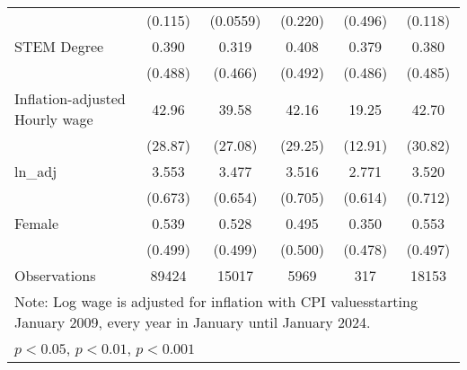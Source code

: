 \begin{table}[htbp]
\begin{tabular}{l*{5}{c}}
                    &     (0.115)         &    (0.0559)         &     (0.220)         &     (0.496)         &     (0.118)         \\
[1em]
STEM Degree         &       0.390         &       0.319         &       0.408         &       0.379         &       0.380         \\
                    &     (0.488)         &     (0.466)         &     (0.492)         &     (0.486)         &     (0.485)         \\
[1em]
Inflation-adjusted Hourly wage&       42.96         &       39.58         &       42.16         &       19.25         &       42.70         \\
                    &     (28.87)         &     (27.08)         &     (29.25)         &     (12.91)         &     (30.82)         \\
[1em]
ln\_adj              &       3.553         &       3.477         &       3.516         &       2.771         &       3.520         \\
                    &     (0.673)         &     (0.654)         &     (0.705)         &     (0.614)         &     (0.712)         \\
[1em]
Female              &       0.539         &       0.528         &       0.495         &       0.350         &       0.553         \\
                    &     (0.499)         &     (0.499)         &     (0.500)         &     (0.478)         &     (0.497)         \\
\hline
Observations        &       89424         &       15017         &        5969         &         317         &       18153         \\
\hline\hline
\multicolumn{6}{l}{\footnotesize Note: Log wage is adjusted for inflation with CPI valuesstarting January 2009, every year in January until January 2024.}\\
\multicolumn{6}{l}{\footnotesize \sym{*} \(p<0.05\), \sym{**} \(p<0.01\), \sym{***} \(p<0.001\)}\\
\end{tabular}
\end{table}
